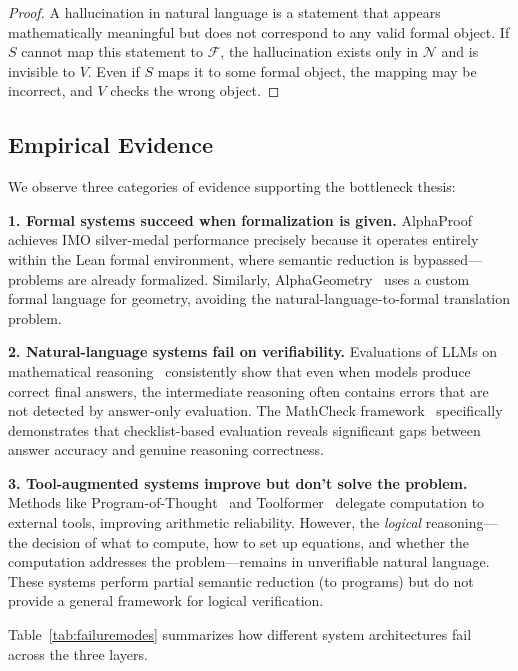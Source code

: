 \documentclass[11pt,a4paper]{article}
\begin{document}
\begin{proof}
A hallucination in natural language is a statement that appears mathematically meaningful but does not correspond to any valid formal object. If $S$ cannot map this statement to $\mathcal{F}$, the hallucination exists only in $\mathcal{N}$ and is invisible to $V$. Even if $S$ maps it to some formal object, the mapping may be incorrect, and $V$ checks the wrong object.
\end{proof}

\subsection{Empirical Evidence}

We observe three categories of evidence supporting the bottleneck thesis:

\textbf{1. Formal systems succeed when formalization is given.} AlphaProof~\cite{hubert2025alphaproof} achieves IMO silver-medal performance precisely because it operates entirely within the Lean formal environment, where semantic reduction is bypassed---problems are already formalized. Similarly, AlphaGeometry~\cite{trinh2024solving} uses a custom formal language for geometry, avoiding the natural-language-to-formal translation problem.

\textbf{2. Natural-language systems fail on verifiability.} Evaluations of LLMs on mathematical reasoning~\cite{liang2024mathcheck, huang2025hallucination} consistently show that even when models produce correct final answers, the intermediate reasoning often contains errors that are not detected by answer-only evaluation. The MathCheck framework~\cite{liang2024mathcheck} specifically demonstrates that checklist-based evaluation reveals significant gaps between answer accuracy and genuine reasoning correctness.

\textbf{3. Tool-augmented systems improve but don't solve the problem.} Methods like Program-of-Thought~\cite{chen2022program} and Toolformer~\cite{schick2023toolformer} delegate computation to external tools, improving arithmetic reliability. However, the \textit{logical} reasoning---the decision of what to compute, how to set up equations, and whether the computation addresses the problem---remains in unverifiable natural language. These systems perform partial semantic reduction (to programs) but do not provide a general framework for logical verification.

Table~\ref{tab:failuremodes} summarizes how different system architectures fail across the three layers.
\end{document}
